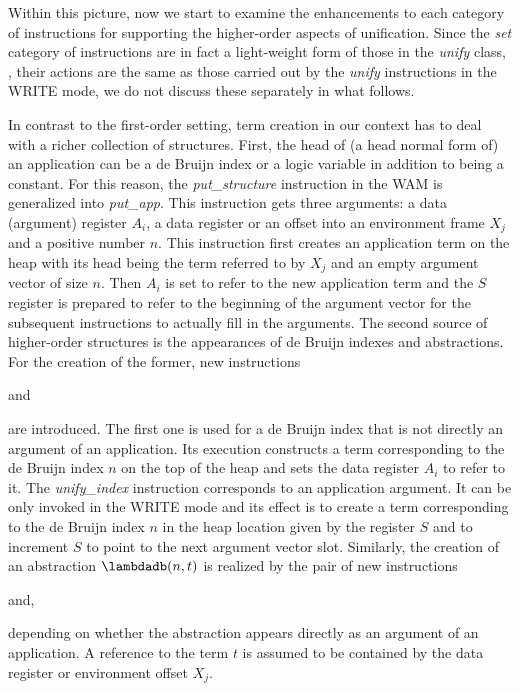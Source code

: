 Within this picture, now we start to examine the enhancements to each
category of instructions for supporting the higher-order aspects
of unification.
Since the {\it set} category of instructions are in
fact a light-weight form of those in the {\it unify} class, \ie,
their actions are the same as those carried out
by the {\it unify} instructions in the WRITE mode, we do not discuss
these separately in what follows.

In contrast to the first-order setting, term creation in our context
has to deal with a
richer collection of structures. First, the head of (a head normal form of)
an application can be a de Bruijn index or a logic variable in
addition to being a constant.
For this reason, the {\it put\_structure} instruction in the WAM is
generalized into {\it put\_app}. This instruction gets three
arguments: a data (argument) register $A_i$, a data register or an
offset into an environment frame $X_j$ and a positive number $n$.
This instruction first creates an application term on the
heap with its head being the term referred to by $X_j$ and an empty argument
vector of size $n$. Then $A_i$ is set to refer to the new application term
and the $S$ register
is prepared to refer to the beginning of the argument vector for the subsequent
instructions to actually fill in the arguments.
The second source of higher-order structures is the appearances of de Bruijn
indexes and abstractions. For the creation of the former, new instructions
\begin{tabbing}
 \dquad and
\end{tabbing}
are introduced. The first one is used for a de Bruijn index
that is not directly an argument of an application. Its execution
constructs a term corresponding to the de Bruijn index $n$ on the top
of the heap and sets the data register $A_i$ to refer to it.
The {\it unify\_index} instruction corresponds to an application argument.
It can be only invoked in the WRITE mode and its effect is to create
a term corresponding to the de Bruijn index $n$ in the
heap location given by the register $S$ and to increment $S$ to point
to the next argument vector slot.
Similarly, the creation of an abstraction $\lambdadb(n, t)$ is realized by
the pair of new instructions
\begin{tabbing}
 \dquad and,
\end{tabbing}
depending on whether the abstraction appears directly as an argument of an
application. A reference to the term $t$ is assumed to be contained by the data
register or environment offset $X_j$.

